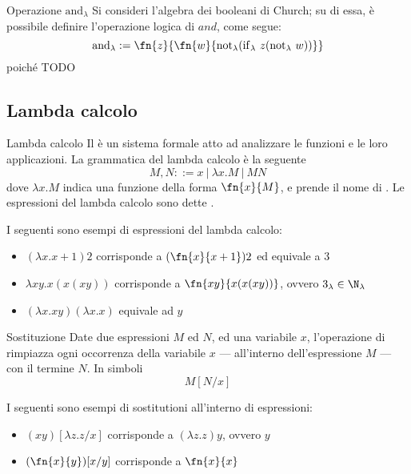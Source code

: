 \documentclass[a4paper, 12pt]{report}
\begin{document}
    \begin{framedprop}{Operazione $\mathrm{and}_\lambda$}
        Si consideri l'algebra dei booleani di Church; su di essa, è possibile definire l'operazione logica di $and$, come segue: $$\mathrm{and}_\lambda := \fn{z}{\fn{w}{\mathrm{not}_\lambda(\mathrm{if}_\lambda \ z (\mathrm{not}_\lambda \ w))}}$$ poiché TODO
    \end{framedprop}

    \subsection{Lambda calcolo}

    \begin{frameddefn}{Lambda calcolo}
        Il  è un sistema formale atto ad analizzare le funzioni e le loro applicazioni. La grammatica del lambda calcolo è la seguente $$M,N ::= x \ | \ \lambda x . M \ | \ MN$$ dove $\lambda x.M$ indica una funzione della forma $\fn{x}{M}$, e prende il nome di . Le espressioni del lambda calcolo sono dette .
    \end{frameddefn}

    \begin{example}
        I seguenti sono esempi di espressioni del lambda calcolo:

        \begin{itemize}
            \item $(\lambda x.x +1)2$ corrisponde a $(\fn{x}{x+1})2$ ed equivale a 3
            \item $\lambda xy.x(x(xy))$ corrisponde a $\fn{xy}{x(x(xy))}$, ovvero $3_\lambda \in \N_\lambda$
            \item $(\lambda x.xy)(\lambda x.x)$ equivale ad $y$
        \end{itemize}
    \end{example}

    \begin{frameddefn}[label={sub}]{Sostituzione}
        Date due espressioni $M$ ed $N$, ed una variabile $x$, l'operazione di  rimpiazza ogni occorrenza della variabile $x$ --- all'interno dell'espressione $M$ --- con il termine $N$. In simboli $$M[N/x]$$ 
    \end{frameddefn}

    \begin{example}[Sostituzioni]
        I seguenti sono esempi di sostitutioni all'interno di espressioni:

        \begin{itemize}
            \item $(xy)[\lambda z.z/x]$ corrisponde a $(\lambda z.z)y$, ovvero $y$
            \item $(\fn{x}{y})[x/y]$ corrisponde a $\fn{x}{x}$
        \end{itemize}
    \end{example}
\end{document}
